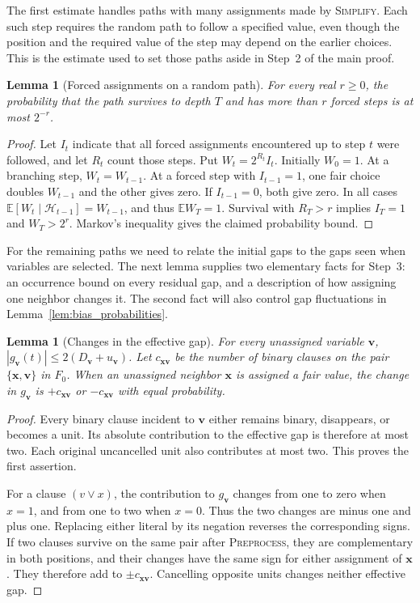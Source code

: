 \documentclass[11pt,a4paper]{article}
\newtheorem{lemma}[theorem]{Lemma}
\theoremstyle{definition}
\theoremstyle{remark}
\newcommand{\E}{\mathbb E}
\begin{document}
The first estimate handles paths with many assignments made by
\textnormal{\textsc{Simplify}}. Each such step requires the random path to
follow a specified value, even though the position and the required value
of the step may depend on the earlier choices. This is the estimate used
to set those paths aside in Step~2 of the main proof.

\begin{lemma}[Forced assignments on a random path]\label{lem:forced_path}
For every real $r\ge0$, the probability that the path survives to depth
$T$ and has more than $r$ forced steps is at most $2^{-r}$.
\end{lemma}
\begin{proof}
Let $I_t$ indicate that all forced assignments encountered up to step $t$
were followed, and let $R_t$ count those steps. Put $W_t=2^{R_t}I_t$.
Initially $W_0=1$. At a branching step, $W_t=W_{t-1}$. At a forced step
with $I_{t-1}=1$, one fair choice doubles $W_{t-1}$ and the other gives zero.
If $I_{t-1}=0$, both give zero. In all cases
$\E[W_t\mid\mathcal H_{t-1}]=W_{t-1}$, and thus $\E W_T=1$.
Survival with $R_T>r$ implies $I_T=1$ and $W_T>2^r$.
Markov's inequality gives the claimed probability bound.
\end{proof}

For the remaining paths we need to relate the initial gaps to the gaps
seen when variables are selected. The next lemma supplies two elementary
facts for Step~3: an occurrence bound on every residual gap, and a
description of how assigning one neighbor changes it. The second fact
will also control gap fluctuations in Lemma~\ref{lem:bias_probabilities}.

\begin{lemma}[Changes in the effective gap]\label{lem:gap_changes}
For every unassigned variable $\mathbf v$,
$|g_{\mathbf v}(t)|\le2(D_{\mathbf v}+u_{\mathbf v})$.
Let $c_{\mathbf x\mathbf v}$ be the number of binary clauses on the pair
$\{\mathbf x,\mathbf v\}$ in $F_0$. When an unassigned neighbor
$\mathbf x$ is assigned a fair value, the change in $g_{\mathbf v}$ is
$+c_{\mathbf x\mathbf v}$ or $-c_{\mathbf x\mathbf v}$ with equal probability.
\end{lemma}
\begin{proof}
Every binary clause incident to $\mathbf v$ either remains binary,
disappears, or becomes a unit. Its absolute contribution to the effective
gap is therefore at most two. Each original uncancelled unit also contributes
at most two. This proves the first assertion.

For a clause $(v\vee x)$, the contribution to $g_{\mathbf v}$ changes from
one to zero when $x=1$, and from one to two when $x=0$. Thus the two
changes are minus one and plus one. Replacing either literal by its
negation reverses the corresponding signs. If two clauses survive on the
same pair after \textnormal{\textsc{Preprocess}}, they are complementary in both
positions, and their changes have the same sign for either assignment of
$\mathbf x$. They therefore add to $\pm c_{\mathbf x\mathbf v}$.
Cancelling opposite units changes neither effective gap.
\end{proof}
\end{document}
